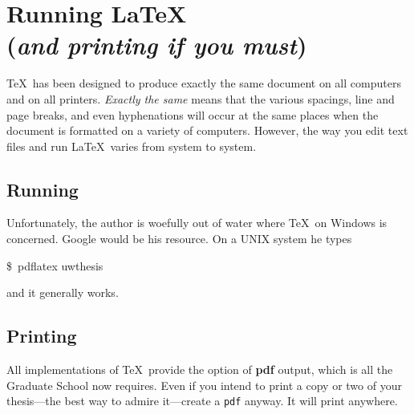 
\chapter{Running \LaTeX\\
  ({\it and printing if you must})}
 
 
\TeX\ has been designed to produce exactly the same document
on all computers and on all printers.  {\it Exactly the same}
means that the various spacings, line and page breaks, and
even hyphenations will occur at the same places
when the document is formatted on a variety of computers.
However, the way you edit text files and run \LaTeX\ varies
from system to system.
 
\section{Running}

Unfortunately, the author is woefully out of water where 
\TeX\ on Windows is concerned.  Google would be his resource.
On a UNIX system he types

\begin{demo}
\$\ pdflatex uwthesis
\end{demo}

and it generally works.

 
\section{Printing}
 
All implementations of \TeX\ provide the option of {\bf pdf} output,
which is all the Graduate School now requires.  Even if you intend to
print a copy or two of your thesis---the best way to admire it---create a 
{\tt pdf} anyway.  It will print anywhere.

\printendnotes
